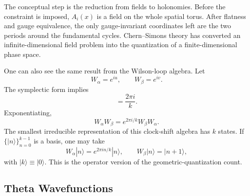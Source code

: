 The conceptual step is the reduction from fields to holonomies. Before the constraint is imposed, $A_i(x)$ is a field on the whole spatial torus. After flatness and gauge equivalence, the only gauge-invariant coordinates left are the two periods around the fundamental cycles. Chern--Simons theory has converted an infinite-dimensional field problem into the quantization of a finite-dimensional phase space.

One can also see the same result from the Wilson-loop algebra. Let
\begin{equation}
  W_\alpha=e^{iu},
  \qquad
  W_\beta=e^{iv}.
  \label{eq:dense-wilson-holonomies}
\end{equation}
The symplectic form implies
\begin{equation}
  [u,v]=\frac{2\pi i}{k}.
  \label{eq:dense-u-v-commutator}
\end{equation}
Exponentiating,
\begin{equation}
  W_\alpha W_\beta
  =
  e^{2\pi i/k}W_\beta W_\alpha.
  \label{eq:dense-clock-shift}
\end{equation}
The smallest irreducible representation of this clock-shift algebra has $k$ states. If $\{|n\rangle\}_{n=0}^{k-1}$ is a basis, one may take
\begin{equation}
  W_\alpha|n\rangle=e^{2\pi i n/k}|n\rangle,
  \qquad
  W_\beta|n\rangle=|n+1\rangle,
  \label{eq:dense-clock-shift-rep}
\end{equation}
with $|k\rangle\equiv|0\rangle$. This is the operator version of the geometric-quantization count.


\subsection{Theta Wavefunctions}
\label{subsec:dense-theta-wavefunctions}

